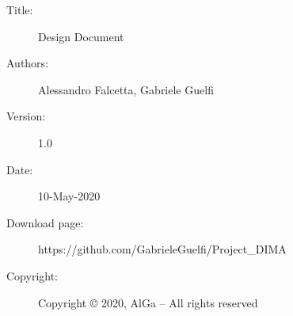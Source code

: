 \thispagestyle{empty}
\begin{description}
	\item[Title:]Design Document
	\item[Authors:]Alessandro Falcetta, Gabriele Guelfi
	\item[Version:]1.0 
	\item[Date:]10-May-2020
	\item[Download page:] https://github.com/GabrieleGuelfi/Project\_DIMA
	\item[Copyright:]Copyright © 2020, AlGa – All rights reserved
\end{description} 
